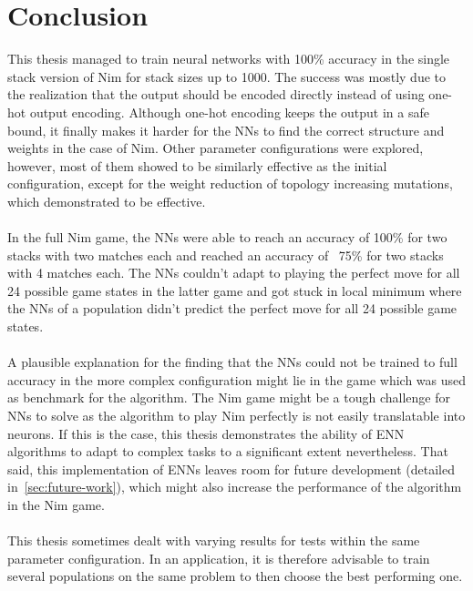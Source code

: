 \section{Conclusion}\label{sec:conclusion}
This thesis managed to train neural networks with 100\% accuracy in the single stack version of Nim for stack sizes up to 1000.
The success was mostly due to the realization that the output should be encoded directly instead of using one-hot output encoding.
Although one-hot encoding keeps the output in a safe bound, it finally makes it harder for the NNs to find the correct structure and weights in the case of Nim.
Other parameter configurations were explored, however, most of them showed to be similarly effective as the initial configuration, except for the weight reduction of topology increasing mutations, which demonstrated to be effective.
\\ \\
In the full Nim game, the NNs were able to reach an accuracy of 100\% for two stacks with two matches each and reached an accuracy of ~75\% for two stacks with 4 matches each.
The NNs couldn't adapt to playing the perfect move for all 24 possible game states in the latter game and got stuck in local minimum where the NNs of a population didn't predict the perfect move for all 24 possible game states.
\\\\
A plausible explanation for the finding that the NNs could not be trained to full accuracy in the more complex configuration might lie in the game which was used as benchmark for the algorithm.
The Nim game might be a tough challenge for NNs to solve as the algorithm to play Nim perfectly is not easily translatable into neurons.
If this is the case, this thesis demonstrates the ability of ENN algorithms to adapt to complex tasks to a significant extent nevertheless.
That said, this implementation of ENNs leaves room for future development (detailed in~\ref{sec:future-work}), which might also increase the performance of the algorithm in the Nim game.
\\ \\
This thesis sometimes dealt with varying results for tests within the same parameter configuration.
In an application, it is therefore advisable to train several populations on the same problem to then choose the best performing one.

